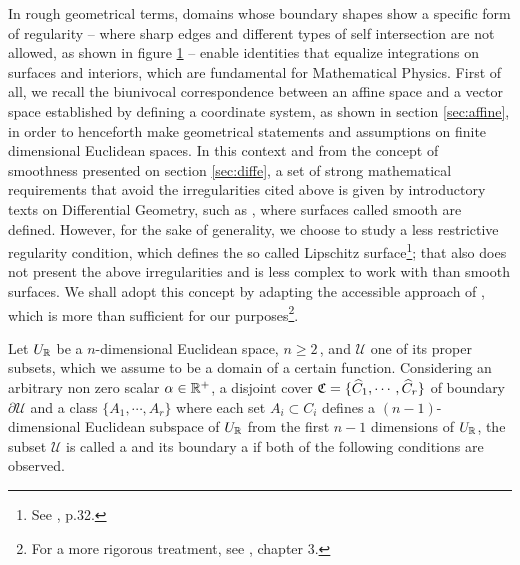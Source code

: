 In rough geometrical terms, domains whose boundary shapes show a specific form of regularity -- where sharp edges and different types of self intersection are not allowed, as shown in figure \ref{fg:naoRegulares} -- enable identities that equalize integrations on surfaces and interiors, which are fundamental for Mathematical Physics. First of all, we recall the biunivocal correspondence between an affine space and a vector space established by defining a coordinate system, as shown in section \ref{sec:affine}, in order to henceforth make geometrical statements and assumptions on finite dimensional Euclidean spaces. In this context and from the concept of smoothness presented on section \ref{sec:diffe}, a set of strong mathematical requirements that avoid the irregularities cited above is given by introductory texts on Differential Geometry, such as \cite{docarmo_2016}, where surfaces called smooth are defined. However, for the sake of generality, we choose to study a less restrictive regularity condition, which defines the so called Lipschitz surface\footnote{ See \cite{ciarlet_1988_2}, p.32.}; that also does not present the above irregularities and is less complex to work with than smooth surfaces. We shall adopt this concept by adapting the accessible approach of \cite{adams_2003_2}, which is more than sufficient for our purposes\footnote{For a more rigorous treatment, see \cite{agranovitch_2015_1}, chapter 3.}.


\begin{figure}[!ht]
	\centering
	\begin{center}
		\scalebox{.72}{}
	\end{center}
	\label{fg:naoRegulares}
\end{figure}


Let $U_{\mathbb{R}}$ be a $n$-dimensional Euclidean space, $n\geqslant 2\,$, and $\pmb{\mathcal{U}}$ one of its proper subsets, which we assume to be a domain of a certain function. Considering an arbitrary non zero scalar $\alpha\in\mathbb{R}^+$, a disjoint cover $\mathfrak{C}=\{\widehat{C}_1,\cdots,\widehat{C}_r\}$ of boundary $\partial\pmb{\mathcal{U}}$ and a class $\{A_1,\cdots,A_r\}$ where each set $A_i\subset C_i$ defines a $(n-1)$-dimensional Euclidean subspace of $U_{\mathbb{R}}$ from the first $n-1$ dimensions of $U_{\mathbb{R}}$, the subset $\pmb{\mathcal{U}}$ is called a  and its boundary a  if both of the following conditions are observed.

